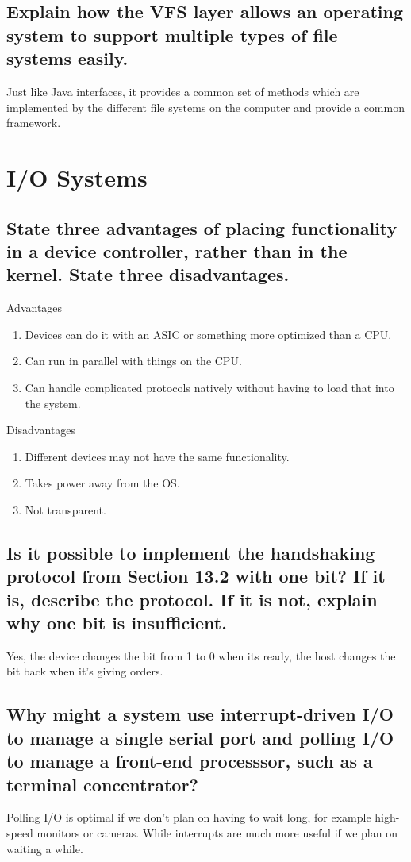 \documentclass{book}%
\begin{document}
\section{Explain how the VFS layer allows an operating system to support
multiple types of file systems easily.}
Just like Java interfaces, it provides a common set of methods which are
implemented by the different file systems on the computer and provide a common
framework.
\chapter{I/O Systems}
\section{State three advantages of placing functionality in a device controller,
rather than in the kernel. State three disadvantages.}
Advantages
\begin{enumerate}
\item Devices can do it with an ASIC or something more optimized than a CPU.
\item Can run in parallel with things on the CPU.
\item Can handle complicated protocols natively without having to load that into
the system.
\end{enumerate}
Disadvantages
\begin{enumerate}
\item Different devices may not have the same functionality.
\item Takes power away from the OS.
\item Not transparent.
\end{enumerate}
\section{Is it possible to implement the handshaking protocol from Section 13.2
with one bit? If it is, describe the protocol. If it is not, explain why one bit
is insufficient.}
Yes, the device changes the bit from 1 to 0 when its ready, the host changes
the bit back when it's giving orders.
\section{Why might a system use interrupt-driven I/O to manage a single serial
port and polling I/O to manage a front-end processsor, such as a terminal
concentrator?}
Polling I/O is optimal if we don't plan on having to wait long, for example
high-speed monitors or cameras. While interrupts are much more useful if we plan
on waiting a while.
\end{document}
